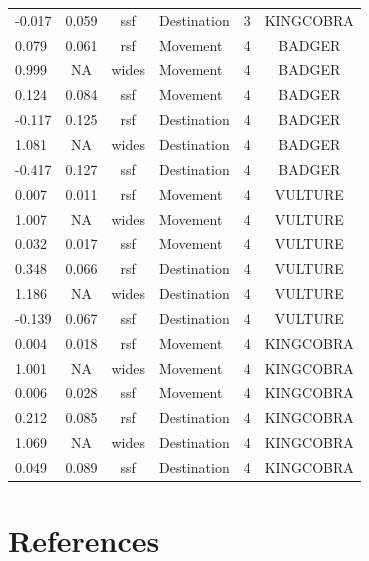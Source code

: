 \documentclass[10pt,a4paper]{article}
\begin{document}
\begin{table}
{\begin{tabular}[t]{lcclcc}
-0.017 & 0.059 & ssf & Destination & 3 & KINGCOBRA\\
0.079 & 0.061 & rsf & Movement & 4 & BADGER\\
0.999 & NA & wides & Movement & 4 & BADGER\\
0.124 & 0.084 & ssf & Movement & 4 & BADGER\\
-0.117 & 0.125 & rsf & Destination & 4 & BADGER\\
1.081 & NA & wides & Destination & 4 & BADGER\\
-0.417 & 0.127 & ssf & Destination & 4 & BADGER\\
0.007 & 0.011 & rsf & Movement & 4 & VULTURE\\
1.007 & NA & wides & Movement & 4 & VULTURE\\
0.032 & 0.017 & ssf & Movement & 4 & VULTURE\\
0.348 & 0.066 & rsf & Destination & 4 & VULTURE\\
1.186 & NA & wides & Destination & 4 & VULTURE\\
-0.139 & 0.067 & ssf & Destination & 4 & VULTURE\\
0.004 & 0.018 & rsf & Movement & 4 & KINGCOBRA\\
1.001 & NA & wides & Movement & 4 & KINGCOBRA\\
0.006 & 0.028 & ssf & Movement & 4 & KINGCOBRA\\
0.212 & 0.085 & rsf & Destination & 4 & KINGCOBRA\\
1.069 & NA & wides & Destination & 4 & KINGCOBRA\\
0.049 & 0.089 & ssf & Destination & 4 & KINGCOBRA\\

\end{tabular}}
\end{table}

\clearpage

\section*{References}\label{references}
\end{document}

